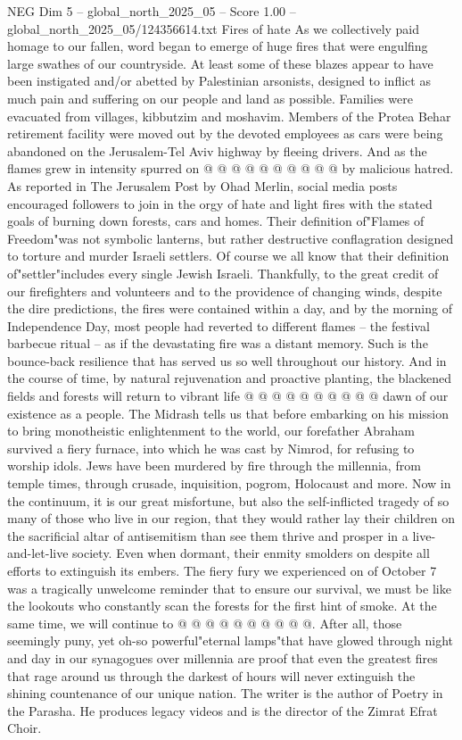 \begin{textsample}{NEG Dim 5 – global\_north\_2025\_05 – Score 1.00 – global\_north\_2025\_05/124356614.txt}
Fires of hate As we collectively paid homage to our fallen, word began to emerge of huge fires that were engulfing large swathes of our countryside.
At least some of these blazes appear to have been instigated and/or abetted by Palestinian arsonists, designed to inflict as much pain and suffering on our people and land as possible.
Families were evacuated from villages, kibbutzim and moshavim.
Members of the Protea Behar retirement facility were moved out by the devoted employees as cars were being abandoned on the Jerusalem-Tel Aviv highway by fleeing drivers.
And as the flames grew in intensity spurred on @ @ @ @ @ @ @ @ @ @ by malicious hatred.
As reported in The Jerusalem Post by Ohad Merlin, social media posts encouraged followers to join in the orgy of hate and light fires with the stated goals of burning down forests, cars and homes.
Their definition of"Flames of Freedom"was not symbolic lanterns, but rather destructive conflagration designed to torture and murder Israeli settlers.
Of course we all know that their definition of"settler"includes every single Jewish Israeli.
Thankfully, to the great credit of our firefighters and volunteers and to the providence of changing winds, despite the dire predictions, the fires were contained within a day, and by the morning of Independence Day, most people had reverted to different flames -- the festival barbecue ritual -- as if the devastating fire was a distant memory.
Such is the bounce-back resilience that has served us so well throughout our history.
And in the course of time, by natural rejuvenation and proactive planting, the blackened fields and forests will return to vibrant life @ @ @ @ @ @ @ @ @ @ dawn of our existence as a people.
The Midrash tells us that before embarking on his mission to bring monotheistic enlightenment to the world, our forefather Abraham survived a fiery furnace, into which he was cast by Nimrod, for refusing to worship idols.
Jews have been murdered by fire through the millennia, from temple times, through crusade, inquisition, pogrom, Holocaust and more.
Now in the continuum, it is our great misfortune, but also the self-inflicted tragedy of so many of those who live in our region, that they would rather lay their children on the sacrificial altar of antisemitism than see them thrive and prosper in a live-and-let-live society.
Even when dormant, their enmity smolders on despite all efforts to extinguish its embers.
The fiery fury we experienced on of October 7 was a tragically unwelcome reminder that to ensure our survival, we must be like the lookouts who constantly scan the forests for the first hint of smoke.
At the same time, we will continue to @ @ @ @ @ @ @ @ @ @.
After all, those seemingly puny, yet oh-so powerful"eternal lamps"that have glowed through night and day in our synagogues over millennia are proof that even the greatest fires that rage around us through the darkest of hours will never extinguish the shining countenance of our unique nation.
The writer is the author of Poetry in the Parasha.
He produces legacy videos and is the director of the Zimrat Efrat Choir.

\end{textsample}
